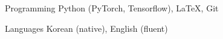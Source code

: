 

\begin{cvskills}

  \cvskill
    {Programming} %
    {Python (PyTorch, Tensorflow), LaTeX, Git} %

  \cvskill
    {Languages} %
    {Korean (native), English (fluent)} %

\end{cvskills}
